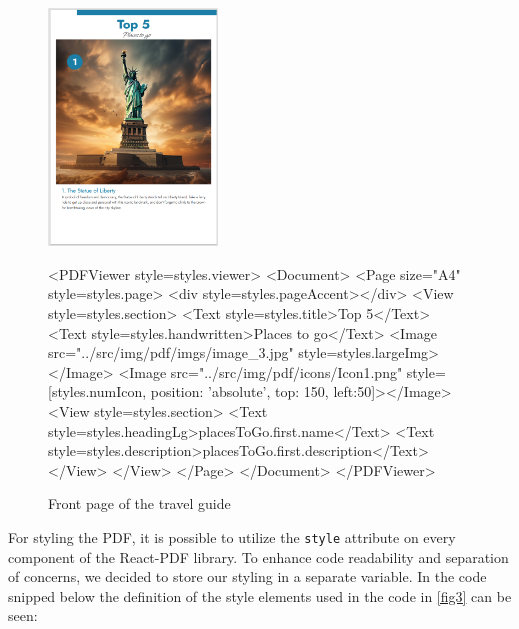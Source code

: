 \documentclass[english,notitlepage,smartquotes]{hgbreport}
\begin{document}
\begin{figure}
	\centering
	\includegraphics[width=0.4\textwidth]{Guide_NY_Top5.png}
	\caption{Front page of the travel guide}
	\label{fig2}
	
	\begin{HtmlCode}
<PDFViewer style={styles.viewer}>
	<Document>
		<Page size="A4" style={styles.page}>
			<div style={styles.pageAccent}></div>
				<View style={styles.section}>
					<Text style={styles.title}>Top 5</Text>
					<Text style={styles.handwritten}>Places to go</Text>
					<Image src="../src/img/pdf/imgs/image_3.jpg" 
						style={styles.largeImg}></Image>
					<Image src="../src/img/pdf/icons/Icon1.png" style={[styles.numIcon, 
						{ position: 'absolute', top: 150, left:50}]}></Image>
					<View style={styles.section}>
					<Text style={styles.headingLg}>{placesToGo.first.name}</Text>
					<Text style={styles.description}>{placesToGo.first.description}</Text>
				</View>
			</View>
		</Page>
 </Document>
</PDFViewer>
	\end{HtmlCode}
\end{figure}
For styling the PDF, it is possible to utilize the \texttt{style} attribute on every component of the React-PDF library. To enhance code readability and separation of concerns, we decided to store our styling in a separate variable. In the code snipped below the definition of the style elements used in the code in \ref{fig3} can be seen:
\end{document}
